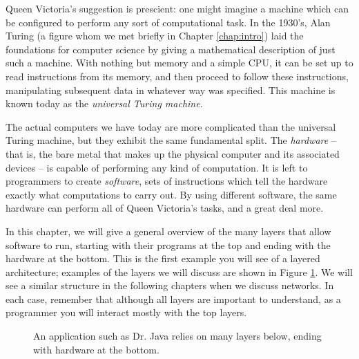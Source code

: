 Queen Victoria's suggestion is prescient: one might imagine a machine which can be configured to perform any sort of computational task. In the 1930's, Alan Turing (a figure whom we met briefly in Chapter \ref{chap:intro}) laid the foundations for computer science by giving a mathematical description of just such a machine. With nothing but memory and a simple CPU, it can be set up to read instructions from its memory, and then proceed to follow these instructions, manipulating subsequent data in whatever way was specified. This machine is known today as the \emph{universal Turing machine}.

The actual computers we have today are more complicated than the universal Turing machine, but they exhibit the same fundamental split. The \emph{hardware} -- that is, the bare metal that makes up the physical computer and its associated devices -- is capable of performing any kind of computation. It is left to programmers to create \emph{software}, sets of instructions which tell the hardware exactly what computations to carry out. By using different software, the same hardware can perform all of Queen Victoria's tasks, and a great deal more.

In this chapter, we will give a general overview of the many layers that allow software to run, starting with their programs at the top and ending with the hardware at the bottom. This is the first example you will see of a layered architecture; examples of the layers we will discuss are shown in Figure \ref{fig:hw_sw:layers}. We will see a similar structure in the following chapters when we discuss networks. In each case, remember that although all layers are important to understand, as a programmer you will interact mostly with the top layers.

\begin{figure}
    \centering
    \caption{An application such as Dr. Java relies on many layers below, ending with hardware at the bottom.}
    \label{fig:hw_sw:layers}
\end{figure}

